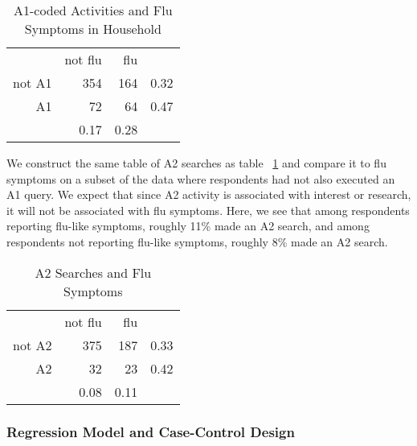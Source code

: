 \documentclass[12pt]{article}
\begin{document}
\begin{table}[!htbp]
\centering
  \caption{A1-coded Activities and Flu Symptoms in Household} 
  \label{descript3} 
\begin{tabular}{rrrr}
  \hline
    & not flu &  flu & \\
not A1 & 354 & 164 & 0.32\\
A1 & 72 & 64 & 0.47 \\
   \hline
   & 0.17 & 0.28 &  \\
   \hline
\end{tabular}
\end{table}

We construct the same table of A2 searches as table ~\ref{descript3} and compare it to flu symptoms on a subset of the data where respondents had not also executed an A1 query. We expect that since A2 activity is associated with interest or research, it will not be associated with flu symptoms. Here, we see that among respondents reporting flu-like symptoms, roughly 11\% made an A2 search, and among respondents not reporting flu-like symptoms, roughly 8\% made an A2 search. 

\begin{table}[!htbp]
\centering
  \caption{A2 Searches and Flu Symptoms} 
  \label{descript4} 
\begin{tabular}{rrrr}
  \hline
    & not flu &  flu & \\
not A2 & 375 & 187 & 0.33 \\
A2 & 32 & 23 & 0.42 \\
   \hline
   & 0.08 & 0.11 & \\
   \hline
\end{tabular}
\end{table}



\subsubsection{Regression Model and Case-Control Design}
\end{document}
